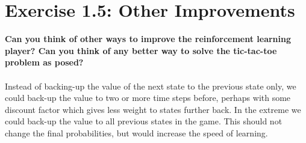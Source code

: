 \documentclass[a4paper,11pt]{article}
\numberwithin{equation}{section}
\theoremstyle{remark}
\begin{document}
\section{Exercise 1.5: Other Improvements}

\textbf{Can you think of other ways to improve the reinforcement learning player? Can you think of any better way to solve the tic-tac-toe problem as posed?}
\\ \\
Instead of backing-up the value of the next state to the previous state only, we could back-up the value to two or more time steps before, perhaps with some discount factor which gives less weight to states further back. In the extreme we could back-up the value to all previous states in the game. This should not change the final probabilities, but would increase the speed of learning.
\end{document}
